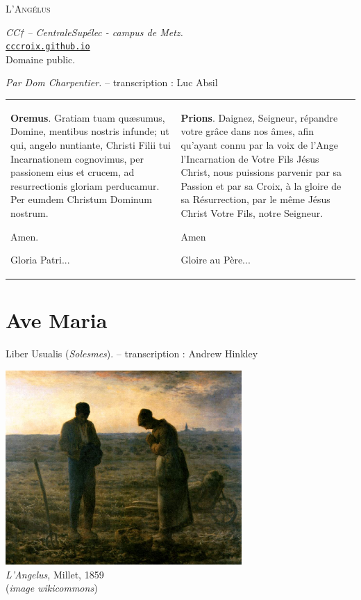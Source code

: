 \documentclass[11pt,a4paper,oneside,BCOR=0cm,DIV=14]{scrartcl}
\begin{document}
\begin{center}
    \Huge \textsc{L’Angélus}

    \vspace{0.4cm}

    {\normalsize \small
        \emph{CC† -- CentraleSupélec - campus de Metz.}\\
        \href{http://cccroix.github.io}{\texttt{cccroix.github.io}}\\
        Domaine public.
    }
\end{center}

\vspace{1cm}

{\flushright\emph{Par Dom Charpentier.} \small-- transcription : Luc Absil\\}

\vspace{1cm}

\begin{center}
{\small
\begin{tabular}{p{5cm} p{5cm}}
\textbf{Oremus}. Gratiam tuam quæsumus, Domine, mentibus nostris infunde; ut qui, angelo nuntiante, Christi Filii tui Incarnationem cognovimus, per passionem eius et crucem, ad resurrectionis gloriam perducamur. Per eumdem Christum Dominum nostrum. 

Amen.

Gloria Patri...
&
\textbf{Prions}. Daignez, Seigneur, répandre votre grâce dans nos âmes, afin qu'ayant connu par la voix de l'Ange l'Incarnation de Votre Fils Jésus Christ, nous puissions parvenir par sa Passion et par sa Croix, à la gloire de sa Résurrection, par le même Jésus Christ Votre Fils, notre Seigneur. 

Amen

Gloire au Père...
\end{tabular}
}
\end{center}

\newpage
\section*{Ave Maria}

\vspace{1cm}

{\flushright Liber Usualis (\emph{Solesmes}). \small-- transcription : Andrew Hinkley\\}


\begin{center}
\vspace{4cm}
\includegraphics[width=9cm]{Millet.jpg}
~\\
\emph{L'Angelus}, Millet, 1859\\ (\emph{{\small image wikicommons}})
\end{center}
\end{document}
